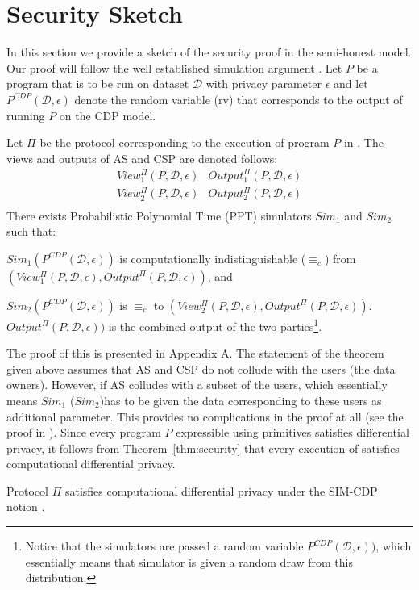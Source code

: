 \section{\system Security Sketch}



In this section we provide a sketch of the security proof in the semi-honest model.
Our proof will follow the well established simulation argument \cite{Oded}. Let $P$ be a program that is to be run on dataset $\mathcal{D}$ with privacy parameter $\epsilon$
 and let $P^{CDP}(\mathcal{D},\epsilon)$ denote the random
variable (rv) that corresponds to the output of running $P$ on the 
\textsf{CDP} model.

\begin{theorem}\label{thm:security}
\rm
Let $\Pi$ be the protocol corresponding to the execution of program $P$ in \system. The
views and outputs of \textsf{AS} and \textsf{CSP} are denoted follows:
\[
\begin{array}{cc}
View_1^{\Pi}(P,\mathcal{D},\epsilon) & Output_1^{\Pi}(P,\mathcal{D},\epsilon) \\
View_2^{\Pi}(P,\mathcal{D},\epsilon) & Output_2^{\Pi}(P,\mathcal{D},\epsilon) \\
\end{array}
\]
There exists Probabilistic Polynomial Time (PPT) simulators $Sim_1$
and $Sim_2$ such that:
\squishlist
\item $Sim_1 (P^{CDP}(\mathcal{D},\epsilon))$ is computationally indistinguishable ($\equiv_c$)
from $(View_1^{\Pi}(P,\mathcal{D},\epsilon),Output^{\Pi}(P,\mathcal{D},\epsilon))$, and
\item $Sim_2 (P^{CDP}(\mathcal{D},\epsilon))$ is $\equiv_c$
to $(View_2^{\Pi}(P,\mathcal{D},\epsilon),Output^{\Pi}(P,\mathcal{D},\epsilon))$.
\squishend
$Output^{\Pi}(P,\mathcal{D},\epsilon))$ is the combined output of the two
parties\footnote{Notice that the simulators are passed a random variable $P^{CDP}(\mathcal{D},\epsilon))$,
which essentially means that simulator is given a random draw from this distribution.}.
\end{theorem}
The proof of this is presented in Appendix A. The statement of the theorem given above assumes
that \textsf{AS} and \textsf{CSP} do not collude with the users (the
data owners). However, if \textsf{AS} colludes with a subset of the
users, which essentially means $Sim_1$ ($Sim_2$)has to be given the data
corresponding to these users as additional parameter. This provides no
complications in the proof at all (see the proof in \cite{LReg}). 
 Since every program $P$ expressible using \system primitives satisfies differential privacy, it follows from Theorem~\ref{thm:security} that every execution of \system satisfies computational differential privacy.
 \noindent
\begin{corollary} 
	Protocol $\Pi$ satisfies computational differential privacy under the \textsf{SIM-CDP} notion \cite{CDP}.
\end{corollary}
